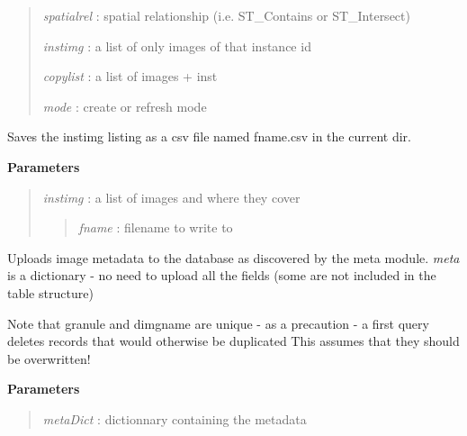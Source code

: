 \documentclass[letterpaper,10pt,openany,oneside]{sphinxmanual}
\begin{document}
\begin{fulllineitems}
\begin{fulllineitems}
\begin{quote}
\emph{spatialrel} : spatial relationship (i.e. ST\_Contains or ST\_Intersect)

\emph{instimg}    : a list of only images of that instance id

\emph{copylist}   : a list of images + inst

\emph{mode}       : create or refresh mode
\end{quote}

\end{fulllineitems}


\begin{fulllineitems}
\label{code:Database.Database.instimgExport}
Saves the instimg listing as a csv file named fname.csv in the current dir.

\textbf{Parameters}
\begin{quote}

\emph{instimg} : a list of images and where they cover
\begin{quote}

\emph{fname}  : filename to write to
\end{quote}
\end{quote}

\end{fulllineitems}


\begin{fulllineitems}
\label{code:Database.Database.meta2db}
Uploads image metadata to the database as discovered by the meta module.
\emph{meta} is a dictionary - no need to upload all the fields (some are not
included in the table structure)

Note that granule and dimgname are unique - as a precaution - a first query
deletes records that would otherwise be duplicated 
This assumes that they should be overwritten!

\textbf{Parameters}
\begin{quote}

\emph{metaDict} : dictionnary containing the metadata
\end{quote}

\end{fulllineitems}



\end{fulllineitems}
\end{document}
